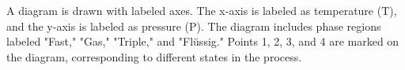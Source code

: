 A diagram is drawn with labeled axes. The x-axis is labeled as temperature (T), and the y-axis is labeled as pressure (P). The diagram includes phase regions labeled "Fast," "Gas," "Triple," and "Flüssig." Points 1, 2, 3, and 4 are marked on the diagram, corresponding to different states in the process.